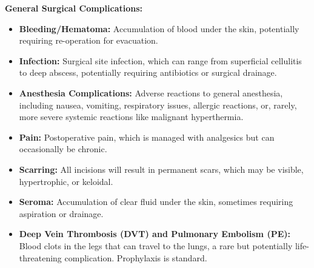 \textbf{General Surgical Complications:}
\begin{itemize}
  \item \textbf{Bleeding/Hematoma:} Accumulation of blood under the skin, potentially requiring re-operation for evacuation.
  \item \textbf{Infection:} Surgical site infection, which can range from superficial cellulitis to deep abscess, potentially requiring antibiotics or surgical drainage.
  \item \textbf{Anesthesia Complications:} Adverse reactions to general anesthesia, including nausea, vomiting, respiratory issues, allergic reactions, or, rarely, more severe systemic reactions like malignant hyperthermia.
  \item \textbf{Pain:} Postoperative pain, which is managed with analgesics but can occasionally be chronic.
  \item \textbf{Scarring:} All incisions will result in permanent scars, which may be visible, hypertrophic, or keloidal.
  \item \textbf{Seroma:} Accumulation of clear fluid under the skin, sometimes requiring aspiration or drainage.
  \item \textbf{Deep Vein Thrombosis (DVT) and Pulmonary Embolism (PE):} Blood clots in the legs that can travel to the lungs, a rare but potentially life-threatening complication. Prophylaxis is standard.
\end{itemize}


